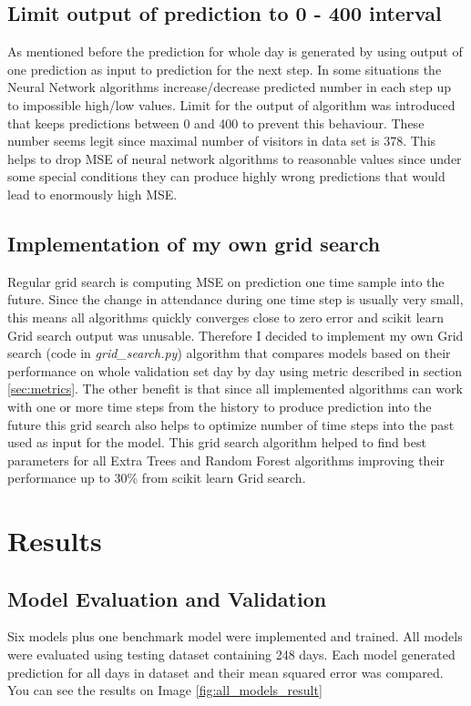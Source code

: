 \documentclass{article}
\begin{document}
\subsection{Limit output of prediction to 0 - 400 interval}
As mentioned before the prediction for whole day is generated by using output of one prediction as input to prediction for the next step. In some situations the Neural Network algorithms increase/decrease predicted number in each step up to impossible high/low values. Limit for the output of algorithm was introduced that keeps predictions between 0 and 400 to prevent this behaviour. These number seems legit since maximal number of visitors in data set is 378. This helps to drop MSE of neural network algorithms to reasonable values since under some special conditions they can produce highly wrong predictions that would lead to enormously high MSE.

\subsection{Implementation of my own grid search} \label{sec:my_grid_search}
Regular grid search is computing MSE on prediction one time sample into the future. Since the change in attendance during one time step is usually very small, this means all algorithms quickly converges close to zero error and scikit learn Grid search output was unusable. Therefore I decided to implement my own Grid search (code in \emph{grid\_search.py}) algorithm that compares models based on their performance on whole validation set day by day using metric described in section \ref{sec:metrics}. The other benefit is that since all implemented algorithms can work with one or more time steps from the history to produce prediction into the future this grid search also helps to optimize number of time steps into the past used as input for the model. This grid search algorithm helped to find best parameters for all Extra Trees and Random Forest algorithms improving their performance up to 30\% from scikit learn Grid search.

\section{Results} \label{sec:results}
\subsection{Model Evaluation and Validation}
Six models plus one benchmark model were implemented and trained. All models were evaluated using testing dataset containing 248 days. Each model generated prediction for all days in dataset and their mean squared error was compared. You can see the results on Image \ref{fig:all_models_result}  
\end{document}
